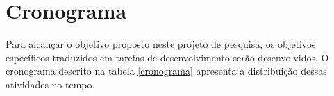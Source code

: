 \section{Cronograma}

Para alcançar o objetivo proposto neste projeto de pesquisa, os objetivos específicos traduzidos em tarefas de desenvolvimento serão desenvolvidos. O cronograma descrito na tabela \ref{cronograma} apresenta a distribuição dessas atividades no tempo.







